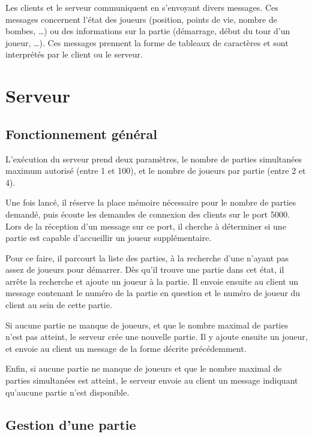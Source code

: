 Les clients et le serveur communiquent en s'envoyant divers messages. Ces messages concernent l'état des joueurs (position, points de vie, nombre de bombes, \dots) ou des informations sur la partie (démarrage, début du tour d'un joueur, \dots). Ces messages prennent la forme de tableaux de caractères et sont interprétés par le client ou le serveur.

\section*{Serveur}

\subsection*{Fonctionnement général}

L'exécution du serveur prend deux paramètres, le nombre de parties simultanées maximum autorisé (entre 1 et 100), et le nombre de joueurs par partie (entre 2 et 4).

Une fois lancé, il réserve la place mémoire nécessaire pour le nombre de parties demandé, puis écoute les demandes de connexion des clients sur le port 5000.\\

Lors de la réception d'un message sur ce port, il cherche à déterminer si une partie est capable d'accueillir un joueur supplémentaire.

Pour ce faire, il parcourt la liste des parties, à la recherche d'une n'ayant pas assez de joueurs pour démarrer. Dès qu'il trouve une partie dans cet état, il arrête la recherche et ajoute un joueur à la partie. Il envoie ensuite au client un message contenant le numéro de la partie en question et le numéro de joueur du client au sein de cette partie.

Si aucune partie ne manque de joueurs, et que le nombre maximal de parties n'est pas atteint, le serveur crée une nouvelle partie. Il y ajoute ensuite un joueur, et envoie au client un message de la forme décrite précédemment.

Enfin, si aucune partie ne manque de joueurs et que le nombre maximal de parties simultanées est atteint, le serveur envoie au client un message indiquant qu'aucune partie n'est disponible.

\subsection*{Gestion d'une partie}

